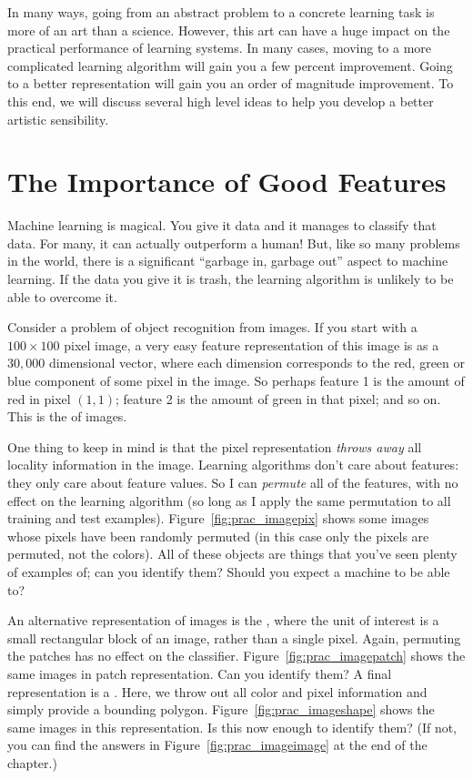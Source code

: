 In many ways, going from an abstract problem to a concrete learning
task is more of an art than a science.  However, this art can have a
huge impact on the practical performance of learning systems.  In many
cases, moving to a more complicated learning algorithm will gain you a
few percent improvement.  Going to a better representation will gain
you an order of magnitude improvement.  To this end, we will discuss
several high level ideas to help you develop a better artistic
sensibility.

\section{The Importance of Good Features}

Machine learning is magical.  You give it data and it manages to
classify that data.  For many, it can actually outperform a human!
But, like so many problems in the world, there is a significant
``garbage in, garbage out'' aspect to machine learning.  If the data
you give it is trash, the learning algorithm is unlikely to be able to
overcome it.


Consider a problem of object recognition from images.  If you start
with a $100 \times 100$ pixel image, a very easy feature
representation of this image is as a $30,000$ dimensional vector,
where each dimension corresponds to the red, green or blue component
of some pixel in the image.  So perhaps feature 1 is the amount of red
in pixel $(1,1)$; feature 2 is the amount of green in that pixel; and
so on.  This is the  of images.

One thing to keep in mind is that the pixel representation
\emph{throws away} all locality information in the image.  Learning
algorithms don't care about features: they only care about feature
values.  So I can \emph{permute} all of the features, with no effect
on the learning algorithm (so long as I apply the same permutation to
all training and test examples).  Figure~\ref{fig:prac_imagepix} shows
some images whose pixels have been randomly permuted (in this case only
the pixels are permuted, not the colors).  All of these objects are
things that you've seen plenty of examples of; can you identify them?
Should you expect a machine to be able to?
\MoveNextFigure{-2.5cm}

An alternative representation of images is the , where the unit of interest is a small rectangular
block of an image, rather than a single pixel.  Again, permuting the
patches has no effect on the classifier.
Figure~\ref{fig:prac_imagepatch} shows the same images in patch
representation.  Can you identify them?  A final representation is a
.  Here, we throw out all color and
pixel information and simply provide a bounding polygon.
Figure~\ref{fig:prac_imageshape} shows the same images in this
representation.  Is this now enough to identify them?  (If not, you
can find the answers in Figure~\ref{fig:prac_imageimage} at the end of the chapter.)


